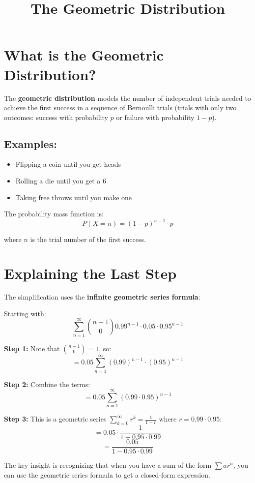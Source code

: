 \documentclass[11pt,letterpaper]{article}
\title{The Geometric Distribution}
\author{}
\date{}
\begin{document}
\maketitle

\section*{What is the Geometric Distribution?}

The \textbf{geometric distribution} models the number of independent trials needed to achieve the first success in a sequence of Bernoulli trials (trials with only two outcomes: success with probability $p$ or failure with probability $1-p$).

\subsection*{Examples:}
\begin{itemize}
    \item Flipping a coin until you get heads
    \item Rolling a die until you get a 6
    \item Taking free throws until you make one
\end{itemize}

The probability mass function is:
\[
P(X = n) = (1-p)^{n-1} \cdot p
\]

where $n$ is the trial number of the first success.

\section*{Explaining the Last Step}

The simplification uses the \textbf{infinite geometric series formula}:

Starting with:
\[
\sum_{n=1}^{\infty} \binom{n-1}{0} 0.99^{n-1} \cdot 0.05 \cdot 0.95^{n-1}
\]

\textbf{Step 1:} Note that $\binom{n-1}{0} = 1$, so:
\[
= 0.05 \sum_{n=1}^{\infty} (0.99)^{n-1} \cdot (0.95)^{n-1}
\]

\textbf{Step 2:} Combine the terms:
\[
= 0.05 \sum_{n=1}^{\infty} (0.99 \cdot 0.95)^{n-1}
\]

\textbf{Step 3:} This is a geometric series $\sum_{k=0}^{\infty} r^k = \frac{1}{1-r}$ where $r = 0.99 \cdot 0.95$:
\[
= 0.05 \cdot \frac{1}{1 - 0.95 \cdot 0.99}
\]
\[
= \frac{0.05}{1 - 0.95 \cdot 0.99}
\]

The key insight is recognizing that when you have a sum of the form $\sum ar^n$, you can use the geometric series formula to get a closed-form expression.
\end{document}
